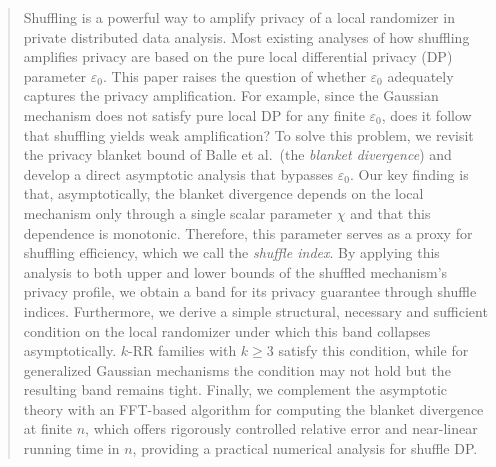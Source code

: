\documentclass{article}
\theoremstyle{plain}
\theoremstyle{definition}
\begin{document}
\begin{abstract}
Shuffling is a powerful way to amplify privacy of a local randomizer in private distributed data analysis.
Most existing analyses of how shuffling amplifies privacy are based on the pure local differential privacy (DP) parameter $\varepsilon_0$.
This paper raises the question of whether $\varepsilon_0$ adequately captures the privacy amplification.
For example, since the Gaussian mechanism does not satisfy pure local DP for any finite $\varepsilon_0$, does it follow that shuffling yields weak amplification?
To solve this problem, we revisit the privacy blanket bound of Balle et al.\ (the \emph{blanket divergence}) and develop a direct asymptotic analysis that bypasses $\varepsilon_0$.
Our key finding is that, asymptotically, the blanket divergence depends on the local mechanism only through a single scalar parameter $\chi$ and that this dependence is monotonic.
Therefore, this parameter serves as a proxy for shuffling efficiency, which we call the \emph{shuffle index}.
By applying this analysis to both upper and lower bounds of the shuffled mechanism's privacy profile, we obtain a band for its privacy guarantee through shuffle indices. 
Furthermore, we derive a simple structural, necessary and sufficient condition on the local randomizer under which this band collapses asymptotically.
$k$-RR families with $k\ge3$ satisfy this condition, while for generalized Gaussian mechanisms the condition may not hold but the resulting band remains tight. 
Finally, we complement the asymptotic theory with an FFT-based algorithm for computing the blanket divergence at finite $n$, which offers rigorously controlled relative error and near-linear running time in $n$, providing a practical numerical analysis for shuffle DP.

\end{abstract}

\end{document}
